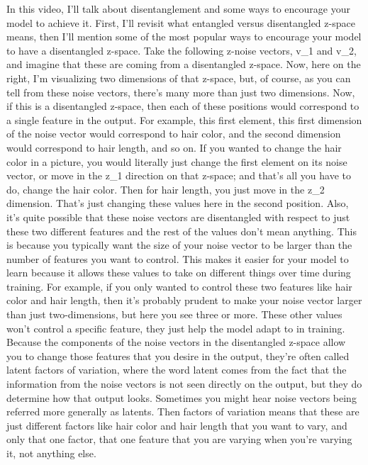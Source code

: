 \documentclass[11pt, onecolumn]{article}
\begin{document}
In this video, I'll talk about disentanglement
and some ways to encourage your model to achieve it.
First, I'll revisit what entangled
versus disentangled z-space means,
then I'll mention some of the most popular ways to
encourage your model to have a disentangled z-space.
Take the following z-noise vectors,
v_1 and v_2, and imagine that
these are coming from a disentangled z-space.
Now, here on the right,
I'm visualizing two dimensions of that z-space, but,
of course, as you can tell from these noise vectors,
there's many more than just two dimensions.
Now, if this is a disentangled z-space,
then each of these positions would
correspond to a single feature in the output.
For example, this first element,
this first dimension of
the noise vector would correspond to hair color,
and the second dimension would
correspond to hair length, and so on.
If you wanted to change the hair color in a picture,
you would literally just
change the first element on its noise vector,
or move in the z_1 direction on that z-space;
and that's all you have to do, change the hair color.
Then for hair length, you just move in the z_2 dimension.
That's just changing these values
here in the second position.
Also, it's quite possible that
these noise vectors are disentangled with respect to
just these two different features
and the rest of the values don't mean anything.
This is because you typically want the size of
your noise vector to be larger
than the number of features you want to control.
This makes it easier for your model
to learn because it allows
these values to take on
different things over time during training.
For example, if you only wanted to control
these two features like hair color and hair length,
then it's probably prudent to make
your noise vector larger than just two-dimensions,
but here you see three or more.
These other values won't control a specific feature,
they just help the model adapt to in training.
Because the components of the noise vectors in
the disentangled z-space allow you to
change those features that you desire in the output,
they're often called latent factors of variation,
where the word latent comes from the fact that
the information from the noise vectors
is not seen directly on the output,
but they do determine how that output looks.
Sometimes you might hear noise vectors
being referred more generally as latents.
Then factors of variation means that these are
just different factors like hair color
and hair length that you want to vary,
and only that one factor,
that one feature that you are varying
when you're varying it, not anything else.
\end{document}
